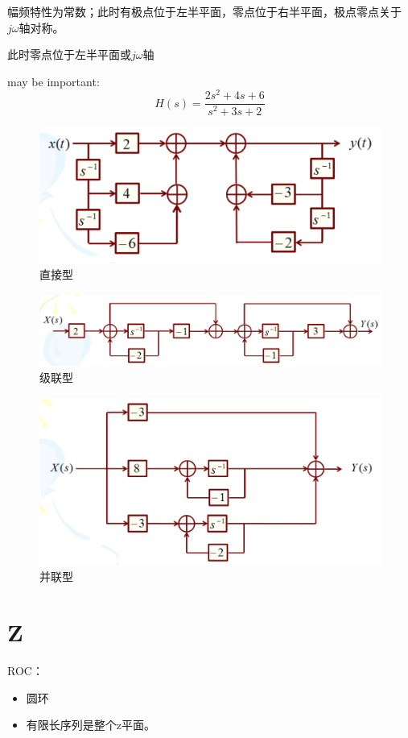 \documentclass{article}
\begin{document}
\begin{defi}[全通网络]幅频特性为常数；此时有极点位于左半平面，零点位于右半平面，极点零点关于$j\omega$轴对称。
\end{defi}

\begin{defi}[最小相移网络]
    此时零点位于左半平面或$j\omega$轴
\end{defi}

\begin{defi}[方框图]may be important:
	\[
		H(s)=\frac{2s^2+4s+6}{s^2+3s+2}
	\]
	\begin{figure}[H]
		\centering
		\includegraphics[width=0.7\linewidth]{直接.png}
		\caption{直接型}
	\end{figure}
	\begin{figure}[H]
		\centering
		\includegraphics[width=0.7\linewidth]{级联.png}
		\caption{级联型}
	\end{figure}
	\begin{figure}[H]
		\centering
		\includegraphics[width=0.7\linewidth]{并联.png}
		\caption{并联型}
	\end{figure}
\end{defi}

\section{Z}

\begin{defi}ROC：
	\begin{itemize}
		\item 圆环
		\item 有限长序列是整个z平面。
	\end{itemize}
\end{defi}
\end{document}
